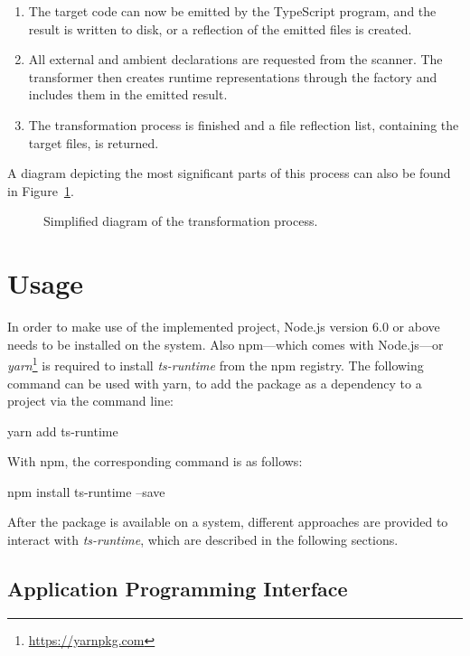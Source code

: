 \begin{enumerate}
  \item The target code can now be emitted by the TypeScript program, and the result is written to disk, or a reflection of the emitted files is created.
  \item All external and ambient declarations are requested from the scanner. The transformer then creates runtime representations through the factory and includes them in the emitted result.
  \item The transformation process is finished and a file reflection list, containing the target files, is returned.
\end{enumerate}
A diagram depicting the most significant parts of this process can also be found in Figure~\ref{fig:transformation-process}.
\begin{figure}
\centering

\caption{Simplified diagram of the transformation process.}
\label{fig:transformation-process}
\end{figure}

\section{Usage}
\label{sec:usage}

In order to make use of the implemented project, Node.js version 6.0 or above needs to be installed on the system. Also npm---which comes with Node.js---or \emph{yarn}\footnote{\url{https://yarnpkg.com}} is required to install \emph{ts-runtime} from the npm registry. The following command can be used with yarn, to add the package as a dependency to a project via the command line:
\begin{GenericCode}[numbers=none]
yarn add ts-runtime
\end{GenericCode}
With npm, the corresponding command is as follows:
\begin{GenericCode}[numbers=none]
npm install ts-runtime --save
\end{GenericCode}
After the package is available on a system, different approaches are provided to interact with \emph{ts-runtime}, which are described in the following sections.

\subsection{Application Programming Interface}
\label{sec:usage-api}


